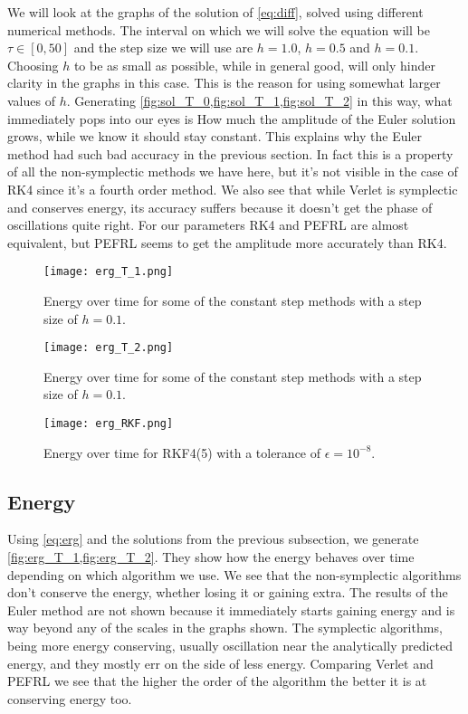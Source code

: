 \documentclass[10pt,a4paper,twocolumn]{article}
\begin{document}
We will look at the graphs of the solution of \cref{eq:diff}, solved using different numerical methods. The interval on which we will solve the equation will be $\tau \in [0, 50]$ and the step size we will use are $h = 1.0$, $h = 0.5$ and $h = 0.1$. Choosing $h$ to be as small as possible, while in general good, will only hinder clarity in the graphs in this case. This is the reason for using somewhat larger values of $h$. Generating \cref{fig:sol_T_0,fig:sol_T_1,fig:sol_T_2} in this way, what immediately pops into our eyes is How much the amplitude of the Euler solution grows, while we know it should stay constant. This explains why the Euler method had such bad accuracy in the previous section. In fact this is a property of all the non-symplectic methods we have here, but it's not visible in the case of RK4 since it's a fourth order method. We also see that while Verlet is symplectic and conserves energy, its accuracy suffers because it doesn't get the phase of oscillations quite right. For our parameters RK4 and PEFRL are almost equivalent, but PEFRL seems to get the amplitude more accurately than RK4.


\begin{figure}
    \centering
    \captionsetup{justification=centering}
    \texttt{[image: erg\_T\_1.png]}
    \caption{Energy over time for some of the constant step methods with a step size of $h = 0.1$.}
    \label{fig:erg_T_1}
\end{figure}

\begin{figure}
    \centering
    \captionsetup{justification=centering}
    \texttt{[image: erg\_T\_2.png]}
    \caption{Energy over time for some of the constant step methods with a step size of $h = 0.1$.}
    \label{fig:erg_T_2}
\end{figure}

\begin{figure}
    \centering
    \captionsetup{justification=centering}
    \texttt{[image: erg\_RKF.png]}
    \caption{Energy over time for RKF4(5) with a tolerance of $\epsilon = 10^{-8}$.}
    \label{fig:erg_RKF}
\end{figure}

\subsection{Energy}

Using \cref{eq:erg} and the solutions from the previous subsection, we generate \cref{fig:erg_T_1,fig:erg_T_2}. They show how the energy behaves over time depending on which algorithm we use. We see that the non-symplectic algorithms don't conserve the energy, whether losing it or gaining extra. The results of the Euler method are not shown because it immediately starts gaining energy and is way beyond any of the scales in the graphs shown. The symplectic algorithms, being more energy conserving, usually oscillation near the analytically predicted energy, and they mostly err on the side of less energy. Comparing Verlet and PEFRL we see that the higher the order of the algorithm the better it is at conserving energy too.
\end{document}
